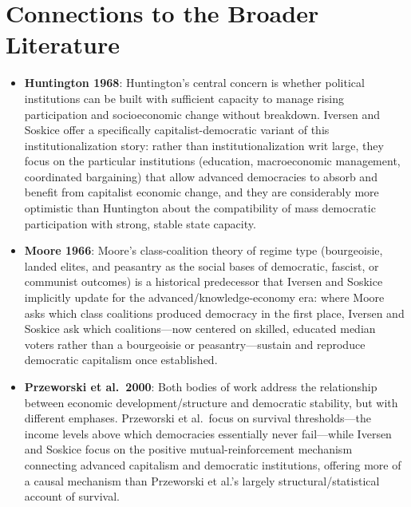 \documentclass[12pt]{article}
\begin{document}
\section{Connections to the Broader Literature}

\begin{itemize}[leftmargin=*, itemsep=4pt]
    \item \textbf{Huntington 1968}: Huntington's central concern is whether political institutions can be built with sufficient capacity to manage rising participation and socioeconomic change without breakdown. Iversen and Soskice offer a specifically capitalist-democratic variant of this institutionalization story: rather than institutionalization writ large, they focus on the particular institutions (education, macroeconomic management, coordinated bargaining) that allow advanced democracies to absorb and benefit from capitalist economic change, and they are considerably more optimistic than Huntington about the compatibility of mass democratic participation with strong, stable state capacity.
    \item \textbf{Moore 1966}: Moore's class-coalition theory of regime type (bourgeoisie, landed elites, and peasantry as the social bases of democratic, fascist, or communist outcomes) is a historical predecessor that Iversen and Soskice implicitly update for the advanced/knowledge-economy era: where Moore asks which class coalitions produced democracy in the first place, Iversen and Soskice ask which coalitions---now centered on skilled, educated median voters rather than a bourgeoisie or peasantry---sustain and reproduce democratic capitalism once established.
    \item \textbf{Przeworski et al.\ 2000}: Both bodies of work address the relationship between economic development/structure and democratic stability, but with different emphases. Przeworski et al.\ focus on survival thresholds---the income levels above which democracies essentially never fail---while Iversen and Soskice focus on the positive mutual-reinforcement mechanism connecting advanced capitalism and democratic institutions, offering more of a causal mechanism than Przeworski et al.'s largely structural/statistical account of survival.

\end{itemize}
\end{document}

